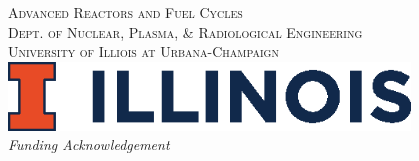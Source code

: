 \begin{titlepage}

    \textsc{\LARGE Advanced Reactors and Fuel Cycles}\\[0.25cm] %

    \textsc{\large Dept. of Nuclear, Plasma, \& Radiological Engineering}\\%

    \textsc{\large University of Illiois at Urbana-Champaign}\\ %




    \vspace{0.5cm}
    \includegraphics[width=0.8\textwidth]{./illinois.eps}\\[1cm] %


    \textit{Funding Acknowledgement}

\end{titlepage}





